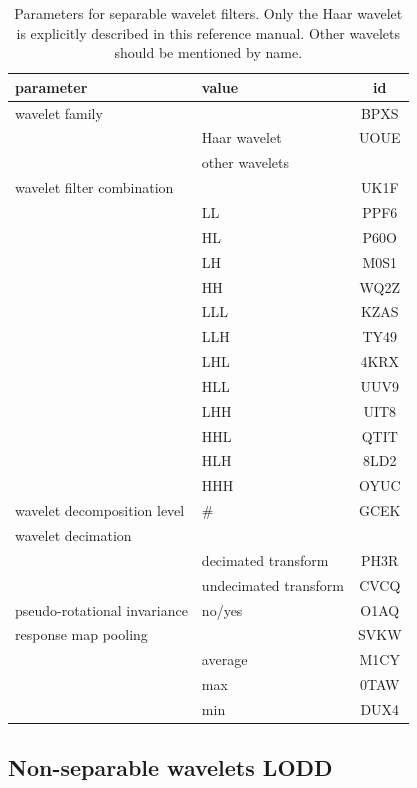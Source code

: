 \documentclass[fleqn,a4paper,oneside,openany]{book}
\newcommand\id[1]{{\hfill\normalsize{\idfont #1}}}
\newcommand\textid[1]{{\normalsize{\idfont #1}}}
\begin{document}
\begin{table}[ht]
\centering
\small
\begin{tabular}{llc}
\toprule
\textbf{parameter} & \textbf{value} & \textbf{id}\\
\midrule
wavelet family & & \textid{BPXS}\\
& Haar wavelet & \textid{UOUE}\\
& other wavelets & \\
wavelet filter combination & & \textid{UK1F}\\
& LL & \textid{PPF6}\\
& HL & \textid{P60O}\\
& LH & \textid{M0S1}\\
& HH & \textid{WQ2Z}\\
& LLL & \textid{KZAS}\\
& LLH & \textid{TY49}\\
& LHL & \textid{4KRX}\\
& HLL & \textid{UUV9}\\
& LHH & \textid{UIT8}\\
& HHL & \textid{QTIT}\\
& HLH & \textid{8LD2}\\
& HHH & \textid{OYUC}\\
wavelet decomposition level & \# & \textid{GCEK}\\
wavelet decimation & &\\
& decimated transform & \textid{PH3R}\\
& undecimated transform & \textid{CVCQ}\\
pseudo-rotational invariance & no/yes & \textid{O1AQ}\\
response map pooling & & \textid{SVKW}\\
& average & \textid{M1CY}\\
& max & \textid{0TAW}\\
& min & \textid{DUX4}\\
\bottomrule
\end{tabular}
\caption{Parameters for separable wavelet filters. Only the Haar wavelet is explicitly described in this reference manual. Other wavelets should be mentioned by name.}
\end{table}

\FloatBarrier

\subsection[Non-separable wavelets]{Non-separable wavelets \id{LODD}}
\end{document}
